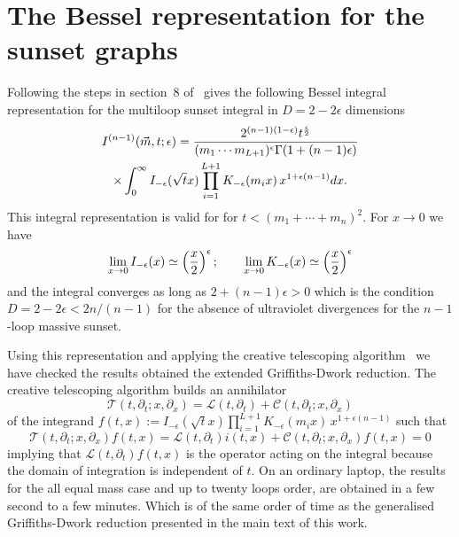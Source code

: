 \documentclass[a4paper,12pt]{article}
\numberwithin{equation}{section}
\numberwithin{figure}{section}
\begin{document}
\appendix\section{The Bessel representation for the sunset graphs}\label{sec:bessel}


Following the steps in section~8 of~\cite{Vanhove:2014wqa}
gives the following Bessel integral representation for the multiloop
sunset integral in  $D=2-2\epsilon$ dimensions
\begin{multline}
  I^{(n-1)}(\vec m,t;\epsilon)=
  {2^{(n-1) (1-\epsilon)} t^{\epsilon\over2} \over    (m_1\cdots m_{L+1})^{\epsilon}
  \Gamma(1+(n-1)\epsilon)}\cr\times\int_0^\infty I_{-\epsilon}(\sqrt{t} x)
  \prod_{i=1}^{L+1}K_{-\epsilon}(m_ix)\,  x^{1+\epsilon(n-1)}dx.
\end{multline}
This integral representation is valid for   for $t<(m_1+\cdots +m_{n})^2$.
%
For $x\to0$ we have
\begin{equation}
  \lim_{x\to0} I_{-\epsilon}(x)\simeq \left(x\over2\right)^{\epsilon};    \qquad
  \lim_{x\to0} K_{-\epsilon}(x)   \simeq \left(x\over2\right)^{\epsilon}
\end{equation}
and the integral converges as long as $2+(n-1)\epsilon>0$ which is the
condition $D=2-2\epsilon< 2n/(n-1)$ for the absence of ultraviolet divergences
for the $n-1$-loop massive sunset.

Using this representation and applying the creative telescoping
algorithm~\cite{Chyzak,Chyzak2,bostan2013creative,Koutchan} we have checked the results obtained the
extended Griffiths-Dwork reduction.
The creative telescoping algorithm builds an annihilator
\begin{equation}
  \mathscr{T}(t,\partial_t; x,\partial_x)= \mathscr{L}(t,\partial_t)+ \mathscr{C}(  t,\partial_t; x,\partial_x)
\end{equation}
of the integrand
$f(t,x):= I_{-\epsilon}(\sqrt{t} x)
  \prod_{i=1}^{L+1}K_{-\epsilon}(m_ix)\,  x^{1+\epsilon(n-1)}$
such that
\begin{equation}
      \mathscr{T}(t,\partial_t; x,\partial_x) f(t,x)=\mathscr{L}(t,\partial_t)i(t,x)+ \mathscr{C}(  t,\partial_t; x,\partial_x) f(t,x)=0
    \end{equation}
    implying that $\mathscr{L}(t,\partial_t)f(t,x)$ is the operator acting
    on the integral because the domain of integration is independent
    of $t$.
On an ordinary laptop, the results for the all equal mass case and up to twenty loops order, are obtained in
a few second to a few minutes. Which is of the same order of time as
the generalised Griffiths-Dwork reduction presented in the main text
of this work.
    
\end{document}
